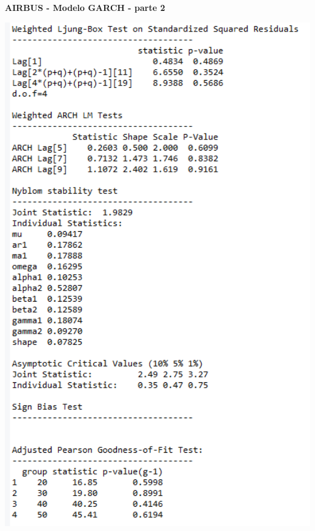 \documentclass[
  12pt,
  a4paper,
  openany]{book}
\begin{document}
\newpage

\begin{center}
 {\normalfont\Large\bfseries AIRBUS - Modelo GARCH - parte 2}
\end{center}

\begin{center}
\begin{minipage}{0.90\linewidth}
    \centering
    \includegraphics[width=2\textwidth]{image/air2.png}
\end{minipage}
\end{center}

\newpage
\end{document}
